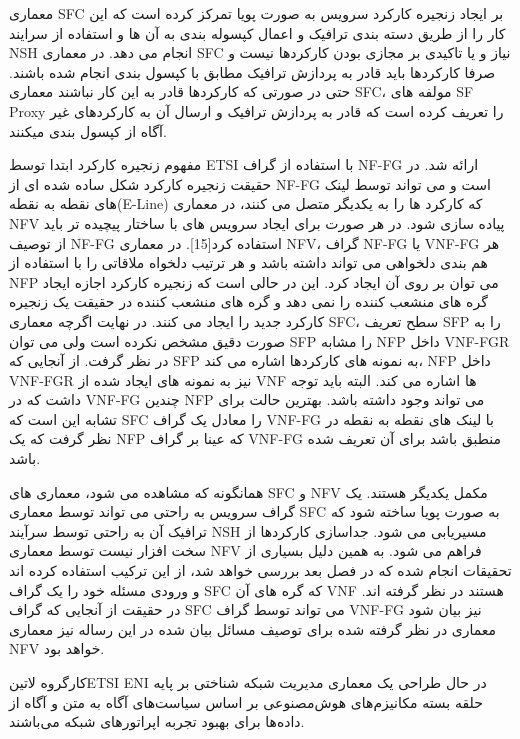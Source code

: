 معماری SFC بر ایجاد زنجیره کارکرد سرویس به صورت پویا تمرکز کرده است که این کار را از طریق دسته بندی ترافیک و اعمال کپسوله بندی به آن ها و استفاده از سرایند NSH انجام می دهد. در معماری SFC نیاز و یا تاکیدی بر مجازی بودن کارکردها نیست و صرفا کارکردها باید قادر به پردازش ترافیک مطابق با کپسول بندی انجام شده باشند. حتی در صورتی که کارکردها قادر به این کار نباشند معماری SFC، مولفه های SF Proxy را تعریف کرده است که قادر به پردازش ترافیک و ارسال آن به کارکردهای غیر آگاه از کپسول بندی میکنند.

مفهوم زنجیره کارکرد ابتدا توسط ETSI با استفاده از گراف NF-FG ارائه شد. در حقیقت زنجیره کارکرد شکل ساده شده ای از NF-FG است و می تواند توسط لینک های نقطه به نقطه(E-Line) که کارکرد ها را به یکدیگر متصل می کنند، در معماری NFV پیاده سازی شود. در هر صورت برای ایجاد سرویس های با ساختار پیچیده تر باید از توصیف NF-FG استفاده کرد[15]. در معماری NFV، گراف NF-FG یا VNF-FG هر هم بندی دلخواهی می تواند داشته باشد و هر ترتیب دلخواه ملاقاتی را با استفاده از NFP می توان بر روی آن ایجاد کرد. این در حالی است که زنجیره کارکرد اجازه ایجاد گره های منشعب کننده را نمی دهد و گره های منشعب کننده در حقیقت یک زنجیره کارکرد جدید را ایجاد می کنند. در نهایت اگرچه معماری SFC، سطح تعریف SFP را به صورت دقیق مشخص نکرده است ولی می توان SFP را مشابه NFP داخل VNF-FGR در نظر گرفت. از آنجایی که SFP به نمونه های کارکردها اشاره می کند، NFP داخل VNF-FGR نیز به نمونه های ایجاد شده از VNF ها اشاره می کند. البته باید توجه داشت که در VNF-FG چندین NFP می تواند وجود داشته باشد. بهترین حالت برای تشابه این است که SFC را معادل یک گراف VNF-FG با لینک های نقطه به نقطه در نظر گرفت که یک NFP که عینا بر گراف VNF-FG منطبق باشد برای آن تعریف شده باشد.

همانگونه که مشاهده می شود، معماری های SFC و NFV مکمل یکدیگر هستند. یک گراف سرویس به راحتی می تواند توسط معماری SFC به صورت پویا ساخته شود که ترافیک آن به راحتی توسط سرآیند NSH مسیریابی می شود. جداسازی کارکردها از سخت افزار نیست توسط معماری NFV فراهم می شود. به همین دلیل بسیاری از تحقیقات انجام شده که در فصل بعد بررسی خواهد شد، از این ترکیب استفاده کرده اند و ورودی مسئله خود را یک گراف SFC که گره های آن VNF هستند در نظر گرفته اند. در حقیقت از آنجایی که گراف SFC می تواند توسط گراف VNF-FG نیز بیان شود معماری در نظر گرفته شده برای توصیف مسائل بیان شده در این رساله نیز معماری NFV خواهد بود.


کارگروه ‌لاتین{ETSI ENI} در حال طراحی یک معماری مدیریت شبکه شناختی
بر پایه حلقه بسته مکانیزم‌های هوش‌مصنوعی بر اساس سیاست‌های آگاه به متن و آگاه از داده‌ها
برای بهبود تجربه اپراتورهای شبکه می‌باشند.

